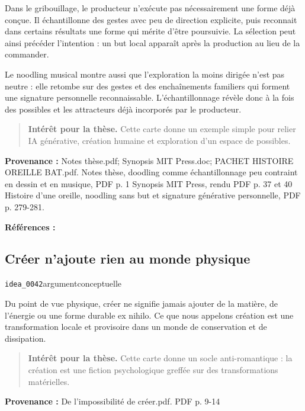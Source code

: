 \documentclass[10pt,a4paper]{article}
\begin{document}
Dans le gribouillage, le producteur n'exécute pas nécessairement une forme déjà conçue. Il échantillonne des gestes avec peu de direction explicite, puis reconnait dans certains résultats une forme qui mérite d'être poursuivie. La sélection peut ainsi précéder l'intention : un but local apparaît après la production au lieu de la commander.

Le noodling musical montre aussi que l'exploration la moins dirigée n'est pas neutre : elle retombe sur des gestes et des enchaînements familiers qui forment une signature personnelle reconnaissable. L'échantillonnage révèle donc à la fois des possibles et les attracteurs déjà incorporés par le producteur.

\begin{quote}
\textbf{Intérêt pour la thèse.} Cette carte donne un exemple simple pour relier IA générative, création humaine et exploration d'un espace de possibles.
\end{quote}
{\footnotesize\color{metadata}\textbf{Provenance :} Notes thèse.pdf; Synopsis MIT Press.doc; PACHET HISTOIRE OREILLE BAT.pdf. Notes thèse, doodling comme échantillonnage peu contraint en dessin et en musique, PDF p. 1 Synopsis MIT Press, rendu PDF p. 37 et 40 Histoire d'une oreille, noodling sans but et signature générative personnelle, PDF p. 279-281.\par}
{\footnotesize\color{metadata}\textbf{Références :} \parencite{pachet2018oreille}\par}

\subsection{Créer n'ajoute rien au monde physique}
{\small\color{metadata} \texttt{idea\_0042}\quad\textbullet\quad argument\quad\textbullet\quad conceptuelle\par}

Du point de vue physique, créer ne signifie jamais ajouter de la matière, de l'énergie ou une forme durable ex nihilo. Ce que nous appelons création est une transformation locale et provisoire dans un monde de conservation et de dissipation.

\begin{quote}
\textbf{Intérêt pour la thèse.} Cette carte donne un socle anti-romantique : la création est une fiction psychologique greffée sur des transformations matérielles.
\end{quote}
{\footnotesize\color{metadata}\textbf{Provenance :} De l'impossibilité de créer.pdf. PDF p. 9-14\par}
\end{document}

